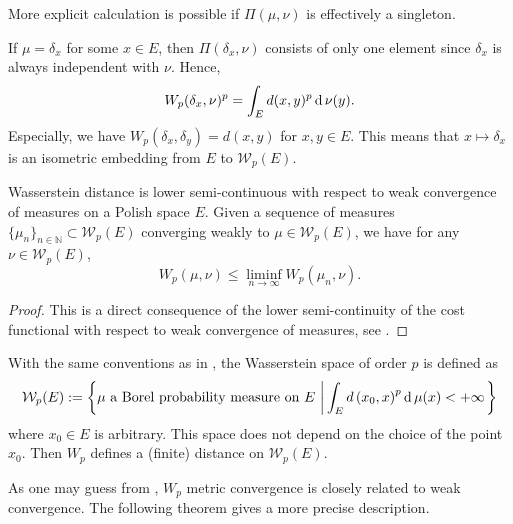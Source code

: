 More explicit calculation is possible if $\Pi(\mu,\nu)$ is effectively a singleton.
\begin{example}
	\label{example:delta_measure_Wasserstein_distance}
	If $\mu=\delta_x$ for some $x \in E$,
	then $\Pi(\delta_x, \nu)$ consists of only one element since $\delta_x$ is always independent with $\nu$.
	Hence,
	\[
		W_p(\delta_x, \nu)^p = \int_{E} d(x, y)^p \operatorname{d} \nu(y).
	\]
	Especially, we have $W_p(\delta_x, \delta_y) = d(x,y)$ for $x,y \in E$.
	This means that $x \mapsto \delta_x$ is an isometric embedding from $E$ to $\mathcal{W}_p(E)$.
\end{example}

\begin{lem}
	\label{lem:lower_semicontinous_Wasserstein_distance}
	Wasserstein distance is lower semi-continuous with respect to weak convergence of measures on a Polish space $E$.
	Given a sequence of measures $\{ \mu_n \}_{n \in \mathbb{N}} \subset \mathcal{W}_p(E)$ converging weakly to $\mu \in \mathcal{W}_p(E)$,
	we have for any $\nu \in \mathcal{W}_p(E)$,
	\[W_p(\mu, \nu) \leq \liminf_{n \rightarrow \infty} W_p(\mu_n, \nu).\]
\end{lem}

\begin{proof}
	This is a direct consequence of the lower semi-continuity of the cost functional
	with respect to weak convergence of measures,
	see .
\end{proof}

\begin{defn}
	\label{Wasserstein_spaces}
	With the same conventions as in , the Wasserstein space of order \( p \) is defined as
	\[
		\mathcal{W}_p(E): = \left\{ \mu \text{ a Borel  probability measure on } E \,\left|
		\, \int _ { E } d \left( x _ { 0 } , x \right) ^ { p } \operatorname{d} \mu (x) < + \infty \right. \right\}
	\]
	where \( x _ { 0 } \in E \) is arbitrary. This space does not depend on the choice of the point \( x _ { 0 } \). Then \( W _ { p } \) defines a (finite) distance on \( \mathcal{W}_p(E) \).
\end{defn}

As one may guess from ,
$W_p$ metric convergence is closely related to weak convergence.
The following theorem gives a more precise description.

